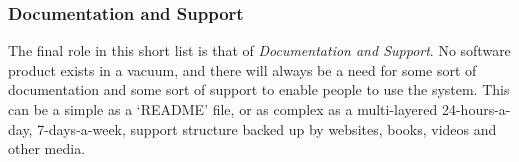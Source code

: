 \subsubsection{Documentation and Support}
The final role in this short list is that of \emph{Documentation and Support}. No software product exists in a vacuum, and there will always be a need for some sort of documentation and some sort of support to enable people to use the system. This can be a simple as a `README' file, or as complex as a multi-layered 24-hours-a-day, 7-days-a-week, support structure backed up by websites, books, videos and other media.

